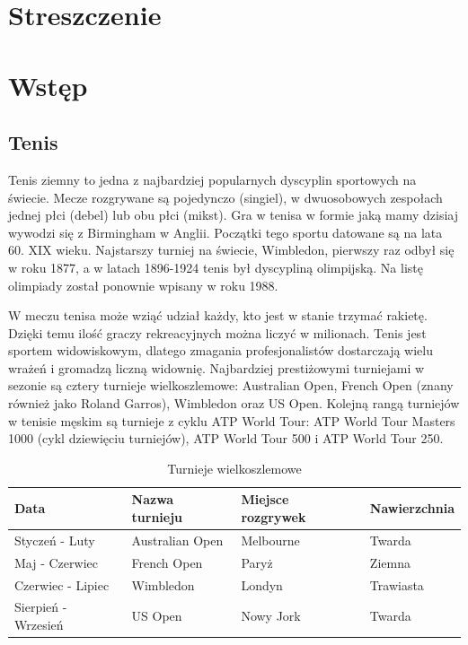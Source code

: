 


\maketitle
\tableofcontents

\chapter{Streszczenie}


\chapter{Wstęp}

\section{Tenis}
\label{Sec:Tenis}
Tenis ziemny to jedna z najbardziej popularnych dyscyplin sportowych na świecie. Mecze rozgrywane są pojedynczo (singiel), w dwuosobowych zespołach jednej płci (debel) lub obu płci (mikst). Gra w tenisa w formie jaką mamy dzisiaj wywodzi się z Birmingham w Anglii. Początki tego sportu datowane są na lata 60. XIX wieku. Najstarszy turniej na świecie, Wimbledon, pierwszy raz odbył się w roku 1877, a w latach 1896-1924 tenis był dyscypliną olimpijską. Na listę olimpiady został ponownie wpisany w roku 1988.\cite{tenis01}

W meczu tenisa może wziąć udział każdy, kto jest w stanie trzymać rakietę. Dzięki temu ilość graczy rekreacyjnych można liczyć w milionach. Tenis jest sportem widowiskowym, dlatego zmagania profesjonalistów dostarczają wielu wrażeń i gromadzą liczną widownię. Najbardziej prestiżowymi turniejami w sezonie są cztery turnieje wielkoszlemowe: Australian Open, French Open (znany również jako Roland Garros), Wimbledon oraz US Open. Kolejną rangą turniejów w tenisie męskim są turnieje z cyklu ATP World Tour: ATP World Tour Masters 1000 (cykl dziewięciu turniejów), ATP World Tour 500 i ATP World Tour 250.\cite{tenis02}

\begin{table}[H]
\centering
\caption{Turnieje wielkoszlemowe\cite{tenis02}}
\label{Tab:Slam}
\begin{tabular}{|l|l|l|l|}
\hline
\textbf{Data}       & \textbf{Nazwa turnieju}     & \textbf{Miejsce rozgrywek} & \textbf{Nawierzchnia} \\ \hline
Styczeń - Luty      & Australian Open             & Melbourne                  & Twarda                \\ \hline
Maj - Czerwiec      & French Open  				  & Paryż                      & Ziemna                \\ \hline
Czerwiec - Lipiec   & Wimbledon                   & Londyn                     & Trawiasta             \\ \hline
Sierpień - Wrzesień & US Open                     & Nowy Jork                  & Twarda                \\ \hline
\end{tabular}
\end{table}

